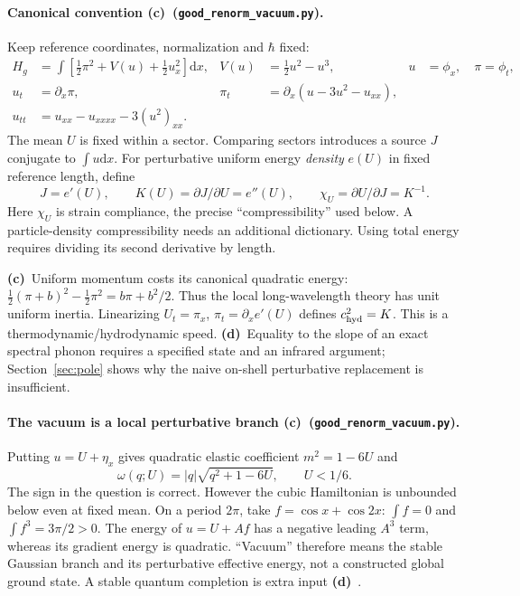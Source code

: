 \documentclass[11pt,a4paper]{article}
\newcommand{\C}{\textbf{(c)}\ }
\newcommand{\D}{\textbf{(d)}\ }
\newcommand{\dd}{\mathrm d}
\newcommand{\file}[1]{\nolinkurl{#1}}
\newcommand{\vac}{\file{good_renorm_vacuum.py}}
\begin{document}
\paragraph{Canonical convention \C (\vac).}
Keep reference coordinates, normalization and $\hbar$ fixed:
\begin{align}
 H_g&=\int[\tfrac12\pi^2+V(u)+\tfrac12u_x^2]\dd x,
 &V(u)&=\tfrac12u^2-u^3, &u&=\phi_x,\quad\pi=\phi_t,\\
 u_t&=\partial_x\pi,
 &\pi_t&=\partial_x(u-3u^2-u_{xx}),\\
 u_{tt}&=u_{xx}-u_{xxxx}-3(u^2)_{xx}.\label{eq:pde}
\end{align}
The mean $U$ is fixed within a sector. Comparing sectors introduces a
source $J$ conjugate to $\int u\dd x$. For perturbative uniform energy
\emph{density} $e(U)$ in fixed reference length, define
\begin{equation}
 J=e'(U),\qquad K(U)=\partial J/\partial U=e''(U),\qquad
 \chi_U=\partial U/\partial J=K^{-1}.\label{eq:response}
\end{equation}
Here $\chi_U$ is strain compliance, the precise ``compressibility'' used
below. A particle-density compressibility needs an additional dictionary.
Using total energy requires dividing its second derivative by length.

\C Uniform momentum costs its canonical quadratic energy:
$\tfrac12(\pi+b)^2-\tfrac12\pi^2=b\pi+b^2/2$.
Thus the local long-wavelength theory has unit uniform inertia.
Linearizing $U_t=\pi_x$, $\pi_t=\partial_x e'(U)$ defines
$c_{\rm hyd}^2=K$. This is a thermodynamic/hydrodynamic speed.
\D Equality to the slope of an exact spectral phonon requires a specified
state and an infrared argument; Section~\ref{sec:pole} shows why the
naive on-shell perturbative replacement is insufficient.

\paragraph{The vacuum is a local perturbative branch \C (\vac).}
Putting $u=U+\eta_x$ gives quadratic elastic coefficient $m^2=1-6U$ and
\begin{equation}
 \omega(q;U)=|q|\sqrt{q^2+1-6U},\qquad U<1/6.\label{eq:disp}
\end{equation}
The sign in the question is correct. However the cubic Hamiltonian is
unbounded below even at fixed mean. On a period $2\pi$, take
$f=\cos x+\cos2x$: $\int f=0$ and $\int f^3=3\pi/2>0$.
The energy of $u=U+A f$ has a negative leading $A^3$ term, whereas its
gradient energy is quadratic. ``Vacuum'' therefore means the stable
Gaussian branch and its perturbative effective energy, not a constructed
global ground state. A stable quantum completion is extra input \D.
\end{document}
